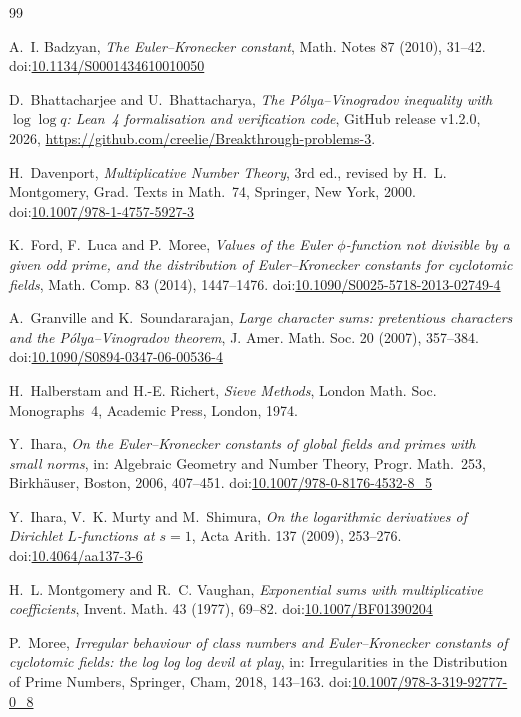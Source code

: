 \documentclass[screen,reqno]{aomart}
\numberwithin{equation}{section}
\newcommand{\releaseURL}{https://github.com/creelie/Breakthrough-problems-3}
\theoremstyle{definition}
\begin{document}
\begin{thebibliography}{99}

 A.~I. Badzyan, \emph{The Euler--Kronecker constant}, Math. Notes 87
(2010), 31--42. doi:\href{https://doi.org/10.1134/S0001434610010050}{10.1134/S0001434610010050}

 D.~Bhattacharjee and U.~Bhattacharya, \emph{The P\'olya--Vinogradov inequality
with $\log\log q$: Lean~4 formalisation and verification code}, GitHub release v1.2.0, 2026,
\url{\releaseURL}.

 H.~Davenport, \emph{Multiplicative Number Theory}, 3rd ed., revised by
H.~L. Montgomery, Grad. Texts in Math.~74, Springer, New York, 2000. doi:\href{https://doi.org/10.1007/978-1-4757-5927-3}{10.1007/978-1-4757-5927-3}

 K.~Ford, F.~Luca and P.~Moree, \emph{Values of the Euler $\phi$-function not
divisible by a given odd prime, and the distribution of Euler--Kronecker constants for cyclotomic
fields}, Math. Comp. 83 (2014), 1447--1476. doi:\href{https://doi.org/10.1090/S0025-5718-2013-02749-4}{10.1090/S0025-5718-2013-02749-4}

 A.~Granville and K.~Soundararajan, \emph{Large character sums: pretentious
characters and the P\'olya--Vinogradov theorem}, J. Amer. Math. Soc. 20 (2007),
357--384. doi:\href{https://doi.org/10.1090/S0894-0347-06-00536-4}{10.1090/S0894-0347-06-00536-4}

 H.~Halberstam and H.-E. Richert, \emph{Sieve Methods}, London Math. Soc.
Monographs~4, Academic Press, London, 1974.

 Y.~Ihara, \emph{On the Euler--Kronecker constants of global fields and primes
with small norms}, in: Algebraic Geometry and Number Theory, Progr. Math.~253, Birkh\"auser,
Boston, 2006, 407--451. doi:\href{https://doi.org/10.1007/978-0-8176-4532-8_5}{10.1007/978-0-8176-4532-8\_5}

 Y.~Ihara, V.~K. Murty and M.~Shimura, \emph{On the logarithmic derivatives of
Dirichlet $L$-functions at $s=1$}, Acta Arith. 137 (2009), 253--276. doi:\href{https://doi.org/10.4064/aa137-3-6}{10.4064/aa137-3-6}

 H.~L. Montgomery and R.~C. Vaughan, \emph{Exponential sums with multiplicative
coefficients}, Invent. Math. 43 (1977), 69--82. doi:\href{https://doi.org/10.1007/BF01390204}{10.1007/BF01390204}

 P.~Moree, \emph{Irregular behaviour of class numbers and Euler--Kronecker
constants of cyclotomic fields: the log log log devil at play}, in: Irregularities in the
Distribution of Prime Numbers, Springer, Cham, 2018, 143--163. doi:\href{https://doi.org/10.1007/978-3-319-92777-0_8}{10.1007/978-3-319-92777-0\_8}


\end{thebibliography}
\end{document}
